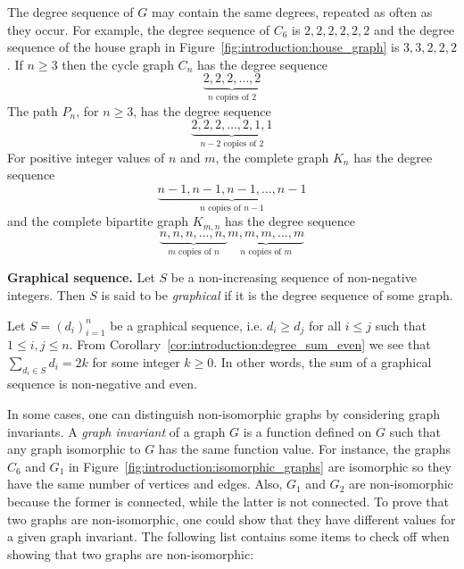 The degree sequence of $G$ may contain the same degrees, repeated as
often as they occur. For example, the degree sequence of $C_6$ is
$2, 2, 2, 2, 2, 2$ and the degree sequence of the house graph in
Figure~\ref{fig:introduction:house_graph} is $3, 3, 2, 2, 2$. If
$n \geq 3$ then the cycle graph $C_n$ has the degree sequence
\[
\underbrace{2, 2, 2, \dots, 2}_{n \text{ copies of } 2}
\]
The path $P_n$, for $n \geq 3$, has the degree sequence
\[
\underbrace{2, 2, 2, \dots, 2, 1, 1}_{n - 2 \text{ copies of } 2}
\]
For positive integer values of $n$ and $m$, the complete graph $K_n$
has the degree sequence
\[
\underbrace{n-1, n-1, n-1, \dots, n-1}_{n \text{ copies of } n-1}
\]
and the complete bipartite graph $K_{m,n}$ has the degree sequence
\[
\underbrace{n, n, n, \dots, n,}_{m \text{ copies of } n}
\underbrace{m, m, m, \dots, m}_{n \text{ copies of } m}
\]

\begin{definition}
\textbf{Graphical sequence.}
Let $S$ be a non-increasing sequence of non-negative integers. Then
$S$ is said to be \emph{graphical} if it is the degree sequence of
some graph.
\end{definition}



Let $S = (d_i)_{i=1}^{n}$ be a graphical sequence, i.e. $d_i \geq d_j$
for all $i \leq j$ such that $1 \leq i, j \leq n$. From
Corollary~\ref{cor:introduction:degree_sum_even} we see that
$\sum_{d_i \in S} d_i = 2k$ for some integer $k \geq 0$. In other
words, the sum of a graphical sequence is non-negative and
even.

In some cases, one can distinguish non-isomorphic graphs by
considering graph invariants. A \emph{graph invariant} of a graph $G$
is a function defined on $G$ such that any graph isomorphic to $G$ has
the same function value. For instance, the graphs $C_6$ and $G_1$ in
Figure~\ref{fig:introduction:isomorphic_graphs} are isomorphic so they
have the same number of vertices and edges. Also, $G_1$ and $G_2$ are
non-isomorphic because the former is connected, while the latter is
not connected. To prove that two graphs are non-isomorphic, one could
show that they have different values for a given graph invariant. The
following list contains some items to check off when showing that two
graphs are non-isomorphic:

